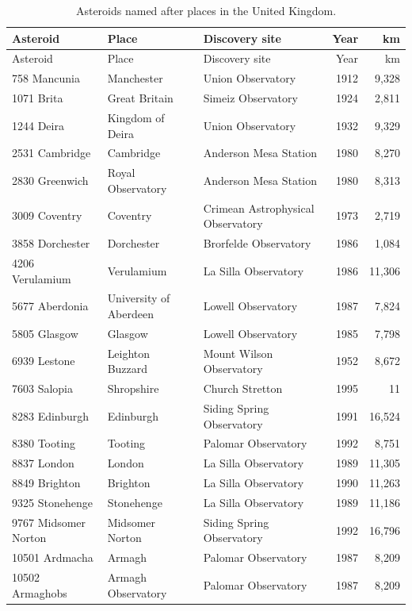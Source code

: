 \documentclass[11pt,a4paper]{article}
\begin{document}
{\footnotesize\begin{longtable}{p{3.4cm}p{4.2cm}p{4.6cm}rr}\caption{Asteroids named after places in the United Kingdom.}\label{tab:uk}\\\toprule Asteroid & Place & Discovery site & Year & km\\\midrule\endfirsthead\toprule Asteroid & Place & Discovery site & Year & km\\\midrule\endhead
758 Mancunia & Manchester & Union Observatory & 1912 & 9,328\\
1071 Brita & Great Britain & Simeiz Observatory & 1924 & 2,811\\
1244 Deira & Kingdom of Deira & Union Observatory & 1932 & 9,329\\
2531 Cambridge & Cambridge & Anderson Mesa Station & 1980 & 8,270\\
2830 Greenwich & Royal Observatory & Anderson Mesa Station & 1980 & 8,313\\
3009 Coventry & Coventry & Crimean Astrophysical Observatory & 1973 & 2,719\\
3858 Dorchester & Dorchester & Brorfelde Observatory & 1986 & 1,084\\
4206 Verulamium & Verulamium & La Silla Observatory & 1986 & 11,306\\
5677 Aberdonia & University of Aberdeen & Lowell Observatory & 1987 & 7,824\\
5805 Glasgow & Glasgow & Lowell Observatory & 1985 & 7,798\\
6939 Lestone & Leighton Buzzard & Mount Wilson Observatory & 1952 & 8,672\\
7603 Salopia & Shropshire & Church Stretton & 1995 & 11\\
8283 Edinburgh & Edinburgh & Siding Spring Observatory & 1991 & 16,524\\
8380 Tooting & Tooting & Palomar Observatory & 1992 & 8,751\\
8837 London & London & La Silla Observatory & 1989 & 11,305\\
8849 Brighton & Brighton & La Silla Observatory & 1990 & 11,263\\
9325 Stonehenge & Stonehenge & La Silla Observatory & 1989 & 11,186\\
9767 Midsomer Norton & Midsomer Norton & Siding Spring Observatory & 1992 & 16,796\\
10501 Ardmacha & Armagh & Palomar Observatory & 1987 & 8,209\\
10502 Armaghobs & Armagh Observatory & Palomar Observatory & 1987 & 8,209\\

\end{longtable}}
\end{document}
